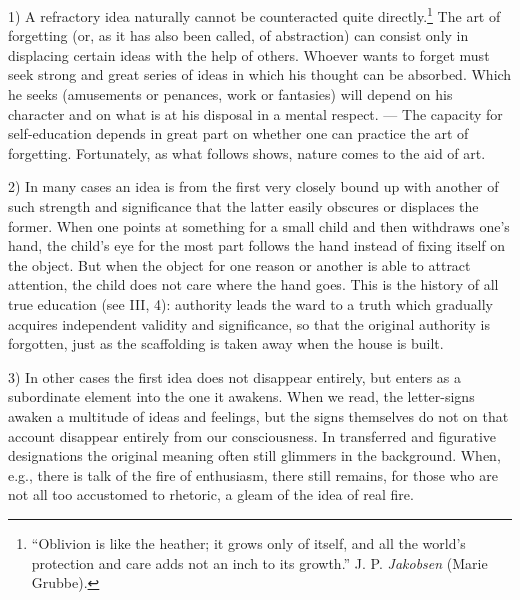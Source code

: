 \documentclass[12pt,a4paper]{book}
\newcommand{\opage}[1]{\marginnote{\footnotesize\textit{[#1]}}}
\begin{document}
1) A refractory idea naturally cannot be counteracted quite
directly.\footnote{``Oblivion is like the heather; it grows only of
itself, and all the world's protection and care adds not an inch to its
growth.'' J. P. \emph{Jakobsen} (Marie Grubbe).} The art of forgetting
(or, as it has also been called, of abstraction) can consist only in
displacing certain ideas with the help of others. Whoever wants to
forget must seek strong and great series of ideas in which
\opage{197}his thought can be absorbed. Which he seeks (amusements or
penances, work or fantasies) will depend on his character and on what is
at his disposal in a mental respect. --- The capacity for self-education
depends in great part on whether one can practice the art of forgetting.
Fortunately, as what follows shows, nature comes to the aid of art.

2) In many cases an idea is from the first very closely bound up with
another of such strength and significance that the latter easily
obscures or displaces the former. When one points at something for a
small child and then withdraws one's hand, the child's eye for the most
part follows the hand instead of fixing itself on the object. But when
the object for one reason or another is able to attract attention, the
child does not care where the hand goes. This is the history of all true
education (see III, 4): authority leads the ward to a truth which
gradually acquires independent validity and significance, so that the
original authority is forgotten, just as the scaffolding is taken away
when the house is built.

3) In other cases the first idea does not disappear entirely, but enters
as a subordinate element into the one it awakens. When we read, the
letter-signs awaken a multitude of ideas and feelings, but the signs
themselves do not on that account disappear entirely from our
consciousness. In transferred and figurative designations the original
meaning often still glimmers in the background. When, e.g., there is
talk of the fire of enthusiasm, there still remains, for those who are
not all too accustomed to rhetoric, a gleam of the idea of real fire.
\end{document}
